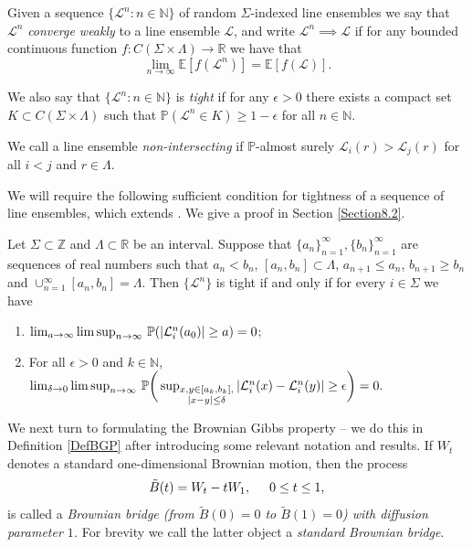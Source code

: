\begin{definition}
Given a sequence $\{ \mathcal{L}^n: n \in \mathbb{N} \}$ of random $\Sigma$-indexed line ensembles we say that $\mathcal{L}^n$ {\em converge weakly} to a line ensemble $\mathcal{L}$, and write $\mathcal{L}^n \implies \mathcal{L}$ if for any bounded continuous function $f: C (\Sigma \times \Lambda) \rightarrow \mathbb{R}$ we have that 
$$\lim_{n \rightarrow \infty} \mathbb{E} \left[ f(\mathcal{L}^n) \right] = \mathbb{E} \left[ f(\mathcal{L}) \right].$$

We also say that $\{ \mathcal{L}^n: n \in \mathbb{N} \}$ is {\em tight} if for any $\epsilon > 0$ there exists a compact set $K \subset C (\Sigma \times \Lambda)$ such that $\mathbb{P}(\mathcal{L}^n \in K) \geq 1- \epsilon$ for all $n \in \mathbb{N}$.

We call a line ensemble {\em non-intersecting} if $\mathbb{P}$-almost surely $\mathcal{L}_i(r) > \mathcal{L}_j(r)$  for all $i < j$ and $r \in \Lambda$.
\end{definition}

We will require the following sufficient condition for tightness of a sequence of line ensembles, which extends \cite[Theorem 7.3]{Billing}. We give a proof in Section \ref{Section8.2}.

\begin{lemma}\label{2Tight}
	Let $\Sigma \subset \mathbb{Z}$ and $\Lambda\subset\mathbb{R}$ be an interval. Suppose that $\{a_n\}_{n = 1}^\infty, \{b_n\}_{n = 1}^\infty$ are sequences of real numbers such that $a_n < b_n$, $[a_n, b_n] \subset \Lambda$, $a_{n+1} \leq a_n$, $b_{n+1} \geq b_n$ and $\cup_{n = 1}^\infty [a_n, b_n] = \Lambda$. Then $\{\mathcal{L}^n\}$ is tight if and only if for every $i\in\Sigma$ we have
	\begin{enumerate}[label=(\roman*)]
		\item $\lim_{a\to\infty} \limsup_{n\to\infty}\, \mathbb{P}(|\mathcal{L}^n_i(a_0)|\geq a) = 0$;
		\item For all $\epsilon>0$ and $k \in \mathbb{N}$,  $\lim_{\delta\to 0} \limsup_{n\to\infty}\, \mathbb{P}\bigg(\sup_{\substack{x,y\in [a_k,b_k], \\ |x-y|\leq\delta}} |\mathcal{L}^n_i(x) - \mathcal{L}^n_i(y)| \geq \epsilon\bigg) = 0.$
		
	\end{enumerate}
\end{lemma}

We next turn to formulating the Brownian Gibbs property -- we do this in Definition \ref{DefBGP} after introducing some relevant notation and results. If $W_t$ denotes a standard one-dimensional Brownian motion, then the process
$$\tilde{B}(t) =  W_t - t W_1, \hspace{5mm} 0 \leq t \leq 1,$$
is called a {\em Brownian bridge (from $\tilde{B}(0) = 0$ to $\tilde{B}(1) = 0 $) with diffusion parameter $1$.} For brevity we call the latter object a {\em standard Brownian bridge}.

